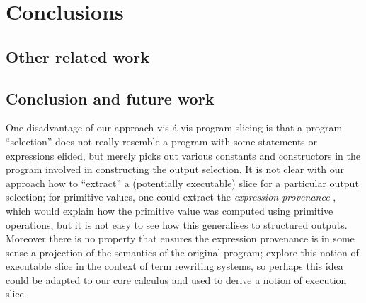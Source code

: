 \section{Conclusions}
\label{sec:conclusion}

\subsection{Other related work}

\subsection{Conclusion and future work}

One disadvantage of our approach vis-\'a-vis program slicing is that a program ``selection'' does not really resemble a program with some statements or expressions elided, but merely picks out various constants and constructors in the program involved in constructing the output selection. It is not clear with our approach how to ``extract'' a (potentially executable) slice for a particular output selection; for primitive values, one could extract the \emph{expression provenance} \cite{acar12}, which would explain how the primitive value was computed using primitive operations, but it is not easy to see how this generalises to structured outputs. Moreover there is no property that ensures the expression provenance is in some sense a projection of the semantics of the original program; \cite{field98} explore this notion of executable slice in the context of term rewriting systems, so perhaps this idea could be adapted to our core calculus and used to derive a notion of execution slice. 
